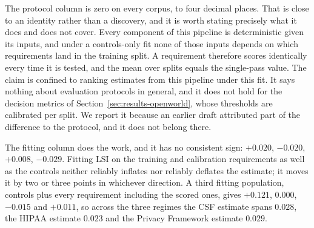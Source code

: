 \documentclass[a4paper,fleqn]{cas-sc}
\begin{document}
\begin{table}[htbp]
\caption{Separating the evaluation protocol from the LSI fitting population. Cell~A is repeated holdouts with LSI fitted on controls only; cell~B is repeated holdouts with LSI fitted on controls plus the training and calibration requirements, which is what the earlier version of this work used; cell~C is the primary one-pass protocol with LSI fitted on controls only. A~vs.~B isolates the fitting population, A~vs.~C isolates the protocol. Unplanned analysis.}
\label{tab:lsi}
\centering
\setlength{\tabcolsep}{3pt}
\small
{}
\end{table}

The protocol column is zero on every corpus, to four decimal places. That is close to an identity rather than a discovery, and it is worth stating precisely what it does and does not cover. Every component of this pipeline is deterministic given its inputs, and under a controls-only fit none of those inputs depends on which requirements land in the training split. A requirement therefore scores identically every time it is tested, and the mean over splits equals the single-pass value. The claim is confined to ranking estimates from this pipeline under this fit. It says nothing about evaluation protocols in general, and it does not hold for the decision metrics of Section~\ref{sec:results-openworld}, whose thresholds are calibrated per split. We report it because an earlier draft attributed part of the difference to the protocol, and it does not belong there.

The fitting column does the work, and it has no consistent sign: $+0.020$, $-0.020$, $+0.008$, $-0.029$. Fitting LSI on the training and calibration requirements as well as the controls neither reliably inflates nor reliably deflates the estimate; it moves it by two or three points in whichever direction. A third fitting population, controls plus every requirement including the scored ones, gives $+0.121$, $0.000$, $-0.015$ and $+0.011$, so across the three regimes the CSF estimate spans $0.028$, the HIPAA estimate $0.023$ and the Privacy Framework estimate $0.029$.
\end{document}
